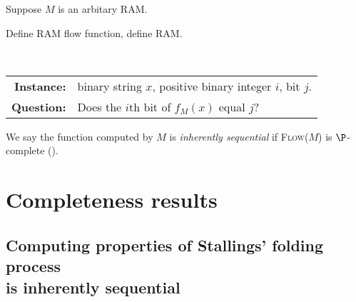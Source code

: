 \documentclass{article}
\begin{document}
Suppose $M$ is an arbitary RAM.

\begin{todo}
  Define RAM flow function, define RAM.
\end{todo}

\begin{definition}
  \mbox{} \\
  \begin{tabular}{r p{9.5cm}}
    \textbf{Instance:} & binary string $x$, positive binary integer $i$, bit $j$. \\
    \textbf{Question:} & Does the $i$th bit of $f_M(x)$ equal $j$?
  \end{tabular}
\end{definition}

We say the function computed by $M$ is \emph{inherently sequential} if \textsc{Flow($M$)} is $\P$-complete (\autocite[Definition~8.2.2]{ghr95}).

\section{Completeness results}

\subsection
    [Computing properties of Stallings' folding process is inherently sequential]
    {Computing properties of Stallings' folding process \\ is inherently sequential}
\end{document}
